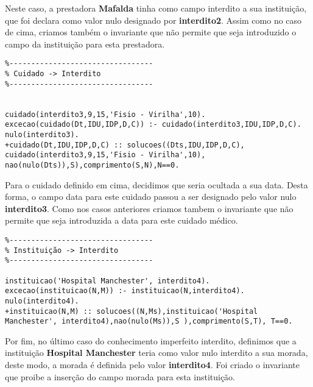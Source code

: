 \documentclass{report}
\begin{document}
Neste caso, a prestadora \textbf{Mafalda} tinha como campo interdito a sua instituição, que foi declara como valor nulo designado por \textbf{interdito2}. Assim como no caso de cima, criamos também o invariante que não permite que seja introduzido o campo da instituição para esta prestadora.

\begin{verbatim}
%---------------------------------
% Cuidado -> Interdito
%---------------------------------


cuidado(interdito3,9,15,'Fisio - Virilha',10).
excecao(cuidado(Dt,IDU,IDP,D,C)) :- cuidado(interdito3,IDU,IDP,D,C).
nulo(interdito3).
+cuidado(Dt,IDU,IDP,D,C) :: solucoes((Dts,IDU,IDP,D,C), cuidado(interdito3,9,15,'Fisio - Virilha',10), nao(nulo(Dts)),S),comprimento(S,N),N==0.
\end{verbatim}

Para o cuidado definido em cima, decidimos que seria ocultada a sua data. Desta forma, o campo data para este cuidado passou a ser designado pelo valor nulo \textbf{interdito3}. Como nos casos anteriores criamos tambem o invariante que não permite que seja introduzida a data para este cuidado médico.

\begin{verbatim}
%---------------------------------
% Instituição -> Interdito
%---------------------------------

instituicao('Hospital Manchester', interdito4).
excecao(instituicao(N,M)) :- instituicao(N,interdito4).
nulo(interdito4).
+instituicao(N,M) :: solucoes((N,Ms),instituicao('Hospital Manchester', interdito4),nao(nulo(Ms)),S ),comprimento(S,T), T==0.
\end{verbatim}

Por fim, no último caso do conhecimento imperfeito interdito, definimos que a instituição \textbf{Hospital Manchester} teria como valor nulo interdito a sua morada, deste modo, a morada é definida pelo valor \textbf{interdito4}. Foi criado o invariante que proibe a inserção do campo morada para esta instituição.
\end{document}
